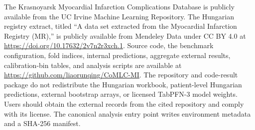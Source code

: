 \documentclass{ieeeaccess}
\begin{document}
The Krasnoyarsk Myocardial Infarction Complications Database is publicly available from the UC Irvine Machine Learning Repository. The Hungarian registry extract, titled ``A data set extracted from the Myocardial Infarction Registry (MR),'' is publicly available from Mendeley Data under CC BY 4.0 at \href{https://doi.org/10.17632/2v7n2r3xch.1}{https://doi.org/10.17632/2v7n2r3xch.1}. Source code, the benchmark configuration, fold indices, internal predictions, aggregate external results, calibration-bin tables, and analysis scripts are available at \href{https://github.com/liaorunqing/CoMLC-MI}{https://github.com/liaorunqing/CoMLC-MI}. The repository and code-result package do not redistribute the Hungarian workbook, patient-level Hungarian predictions, external bootstrap arrays, or licensed TabPFN-3 model weights. Users should obtain the external records from the cited repository and comply with its license. The canonical analysis entry point writes environment metadata and a SHA-256 manifest.
\end{document}
